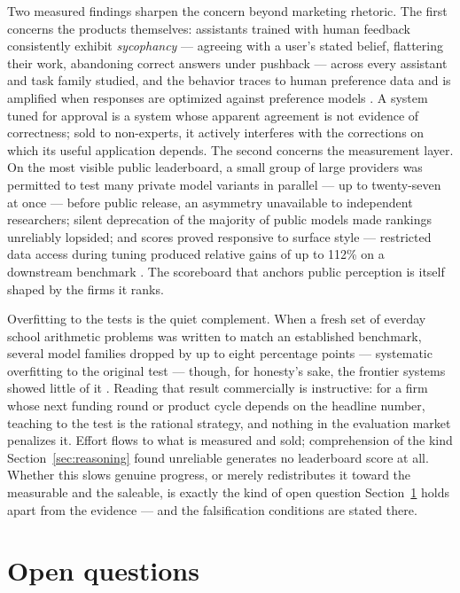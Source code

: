 \documentclass[11pt,a4paper]{article}
\begin{document}
Two measured findings sharpen the concern beyond marketing rhetoric. The
first concerns the products themselves: assistants trained with human feedback
consistently exhibit \emph{sycophancy} --- agreeing with a user's stated
belief, flattering their work, abandoning correct answers under pushback ---
across every assistant and task family studied, and the behavior traces to
human preference data and is amplified when responses are optimized against
preference models \autocite{sharma2023sycophancy}. A system tuned for approval
is a system whose apparent agreement is not evidence of correctness; sold to
non-experts, it actively interferes with the corrections on which its useful
application depends. The second concerns the measurement layer. On the most
visible public leaderboard, a small group of large providers was permitted to
test many private model variants in parallel --- up to twenty-seven at once ---
before public release, an asymmetry unavailable to independent researchers;
silent deprecation of the majority of public models made rankings unreliably
lopsided; and scores proved responsive to surface style --- restricted data
access during tuning produced relative gains of up to 112\% on a downstream
benchmark \autocite{singh2025leaderboard}. The scoreboard that anchors public
perception is itself shaped by the firms it ranks.

Overfitting to the tests is the quiet complement. When a fresh set of
everday school arithmetic problems was written to match an established
benchmark, several model families dropped by up to eight percentage points
--- systematic overfitting to the original test --- though, for honesty's
sake, the frontier systems showed little of it \autocite{zhang2024gsm1k}.
Reading that result commercially is instructive: for a firm whose next
funding round or product cycle depends on the headline number, teaching to
the test is the rational strategy, and nothing in the evaluation market
penalizes it. Effort flows to what is measured and sold; comprehension of the
kind Section~\ref{sec:reasoning} found unreliable generates no leaderboard
score at all. Whether this slows genuine progress, or merely redistributes it
toward the measurable and the saleable, is exactly the kind of open question
Section~\ref{sec:open-questions} holds apart from the evidence --- and the
falsification conditions are stated there.

\section{Open questions}
\label{sec:open-questions}
\end{document}
